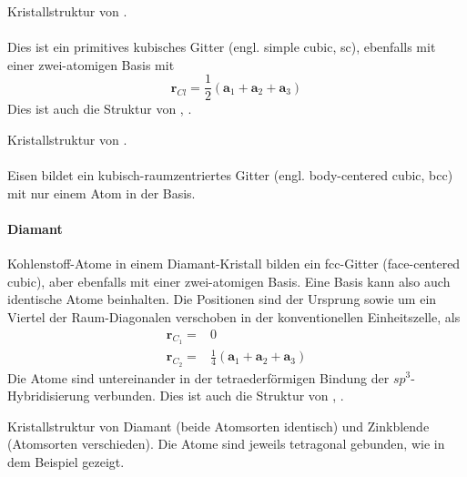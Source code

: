 \begin{marginfigure}

\caption{Kristallstruktur von .}
\end{marginfigure}

\paragraph{}
Dies ist ein primitives kubisches Gitter (engl. simple cubic, sc), ebenfalls mit einer zwei-atomigen Basis mit 
\begin{equation}
 \mathbf{r}_{Cl} = \frac{1}{2} \left(\mathbf{a}_1 + \mathbf{a}_2 +  \mathbf{a}_3  \right)
\end{equation}
Dies ist auch die Struktur von , .

\begin{marginfigure}

\caption{Kristallstruktur von .}
\end{marginfigure}

\paragraph{} Eisen bildet ein kubisch-raumzentriertes Gitter (engl. body-centered cubic, bcc) mit nur einem Atom in der Basis.

\paragraph{Diamant} Kohlenstoff-Atome in einem Diamant-Kristall bilden ein fcc-Gitter (face-centered cubic), aber ebenfalls mit einer zwei-atomigen Basis. Eine Basis kann also auch identische Atome beinhalten. Die Positionen sind der Ursprung sowie um ein Viertel der Raum-Diagonalen verschoben in der konventionellen Einheitszelle, als
\begin{align}
 \mathbf{r}_{C_1} = & 0 \\
 \mathbf{r}_{C_2} = & \frac{1}{4} \left(\mathbf{a}_1 + \mathbf{a}_2 +  \mathbf{a}_3  \right)
\end{align}
Die Atome sind untereinander in der tetraederförmigen Bindung der $sp^3$-Hybridisierung verbunden. Dies ist auch die Struktur von , .

\begin{marginfigure}

\caption{Kristallstruktur von  Diamant (beide Atomsorten identisch) und Zinkblende (Atomsorten verschieden). Die Atome sind jeweils tetragonal gebunden, wie in dem Beispiel gezeigt.}
\end{marginfigure}

